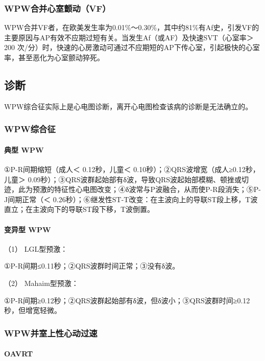 \subsubsection{WPW合并心室颤动（VF）}

WPW合并VF者，在欧美发生率为0.01\%～0.30\%，其中约81\%有Af史，引发VF的主要原因与AP有效不应期过短有关。当发生Af（或AF）及快速SVT（心室率＞
200
次/分）时，快速的心房激动可通过不应期短的AP下传心室，引起极快的心室率，甚至恶化为心室颤动猝死。

\subsection{诊断}

WPW综合征实际上是心电图诊断，离开心电图检查该病的诊断是无法确立的。

\subsubsection{WPW综合征}

\paragraph{典型 WPW}

①P-R间期缩短（成人＜ 0.12秒，儿童＜
0.10秒）；②QRS波增宽（成人≥0.12秒，儿童＞
0.09秒）；③QRS波群起始部有δ波，导致QRS波起始部模糊、顿挫或切迹，此为预激的特征性心电图改变；④δ波常与P波融合，从而使P-R段消失；⑤P-J间期正常（＜
0.26秒）；⑥继发性ST-T改变：在主波向上的导联ST段上移，T波直立；在主波向下的导联ST段下移，T波倒置。

\paragraph{变异型 WPW}

\hypertarget{text00294.htmlux5cux23CHP10-2-7-2-1-2-1}{}
（1） LGL型预激：

①P-R间期≤0.11秒；②QRS波群时间正常；③没有δ波。

\hypertarget{text00294.htmlux5cux23CHP10-2-7-2-1-2-2}{}
（2） Mahaim型预激：

①P-R间期≥0.12秒；②QRS波群起始部有δ波，但δ波小；③QRS波群时间≥0.12秒，但增宽轻微。

\subsubsection{WPW并室上性心动过速}

\paragraph{OAVRT}


